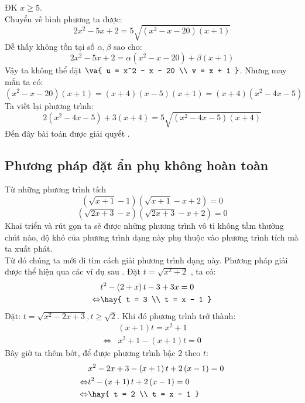 \hda
ĐK $x\geq 5$.\\
Chuyển vế bình phương ta được: 
$$2x^2 - 5x + 2 = 5\sqrt {\left( {x^2 - x - 20} \right)\left( {x + 1} \right)} $$
Dễ thấy không tồn tại số $\alpha ,\beta $ sao cho:
$$2x^2 - 5x + 2 = \alpha \left( {x^2 - x - 20} \right) + \beta \left( {x + 1} \right)$$ 
Vậy ta không thể đặt 
$\va{
 u = x^2 - x - 20 \\ 
 v = x + 1 }$.
Nhưng may mắn ta có:  $$\left( {x^2 - x - 20} \right)\left( {x + 1} \right) = \left( {x + 4} \right)\left( {x - 5} \right)\left( {x + 1} \right) = \left( {x + 4} \right)\left( {x^2 - 4x - 5} \right)$$
Ta viết lại phương trình: $$2\left( {x^2 - 4x - 5} \right) + 3\left( {x + 4} \right) = 5\sqrt {(x^2 - 4x - 5)(x + 4)} $$ Đến đây bài toán được giải quyết . 
\subsection{Phương pháp đặt ẩn phụ không hoàn toàn} 
Từ những phương trình tích 
$$\left( {\sqrt {x + 1} - 1} \right)\left( {\sqrt {x + 1} - x + 2} \right) = 0$$
$$\left( {\sqrt {2x + 3} - x} \right)\left( {\sqrt {2x + 3} - x + 2} \right) = 0$$
Khai triển và rút gọn ta sẽ được những phương trình vô tỉ không tầm thường chút nào, độ khó của phương trình dạng này phụ thuộc vào phương trình tích mà ta xuất phát.\\
Từ đó chúng ta mới đi tìm cách giải phương trình dạng này. Phương pháp giải được thể hiện qua các ví dụ sau .
\hda 
Đặt $t = \sqrt {x^2 + 2}$ , ta có: 
\begin{align*}
& t^2 - \left( {2 + x} \right)t - 3 + 3x = 0 \\
 \Leftrightarrow & \hay{
 t = 3 \\ 
 t = x - 1 }
\end{align*}
\hda
Đặt: $t = \sqrt {x^2 - 2x + 3} , t \ge \sqrt 2 $. Khi đó phương trình trở thành:  
\begin{align*}
& \left( {x + 1} \right)t = x^2 + 1 \\ \Leftrightarrow & x^2 + 1 - \left( {x + 1} \right)t = 0
\end{align*}
Bây giờ ta thêm bớt, để được phương trình bậc 2 theo $t$:  
\begin{align*}
& x^2 - 2x + 3 - \left( {x + 1} \right)t + 2\left( {x - 1} \right) = 0\\ \Leftrightarrow & t^2 - \left( {x + 1} \right)t + 2\left( {x - 1} \right) = 0 \\ \Leftrightarrow & \hay{
 t = 2 \\ 
 t = x - 1 }
\end{align*}
